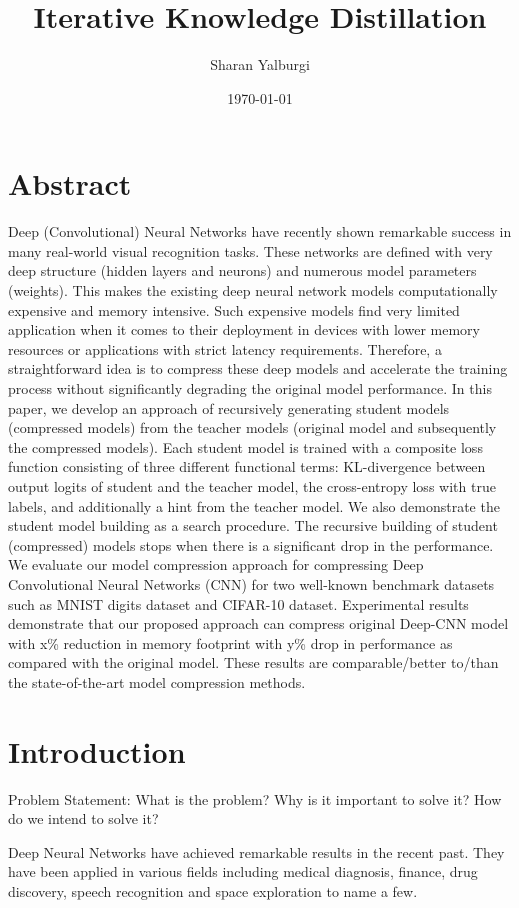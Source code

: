 \documentclass[a4paper,twocolumn]{article}
\author{Sharan Yalburgi}
\date{\today}
\title{Iterative Knowledge Distillation}
\begin{document}
\maketitle

\section{Abstract}
\label{sec-1}
Deep (Convolutional) Neural Networks have recently shown remarkable success in many real-world visual recognition tasks. These networks are defined with very deep structure (hidden layers and neurons) and numerous model parameters (weights). This makes the existing deep neural network models computationally expensive and memory intensive. Such expensive models find very limited application when it comes to their deployment in devices with lower memory resources or applications with strict latency requirements. Therefore, a straightforward idea is to compress these deep models and accelerate the training process without significantly degrading the original model performance. In this paper, we develop an approach of recursively generating student models (compressed models) from the teacher models (original model and subsequently the compressed models). Each student model is trained with a composite loss function consisting of three different functional terms: KL-divergence between output logits of student and the teacher model, the cross-entropy loss with true labels, and additionally a hint from the teacher model. We also demonstrate the student model building as a search procedure. The recursive building of student (compressed) models stops when there is a significant drop in the performance. We evaluate our model compression approach for compressing Deep Convolutional Neural Networks (CNN) for two well-known benchmark datasets such as MNIST digits dataset and CIFAR-10 dataset. Experimental results demonstrate that our proposed approach can compress original Deep-CNN model with x\% reduction in memory footprint with y\% drop in performance as compared with the original model. These results are comparable/better to/than the state-of-the-art model compression methods.
\section{Introduction}
\label{sec-2}
Problem Statement: What is the problem? Why is it important to solve
it? How do we intend to solve it?

Deep Neural Networks have achieved remarkable results in the recent
past. They have been applied in various fields including medical
diagnosis, finance, drug discovery, speech recognition and space
exploration to name a few.
\end{document}
